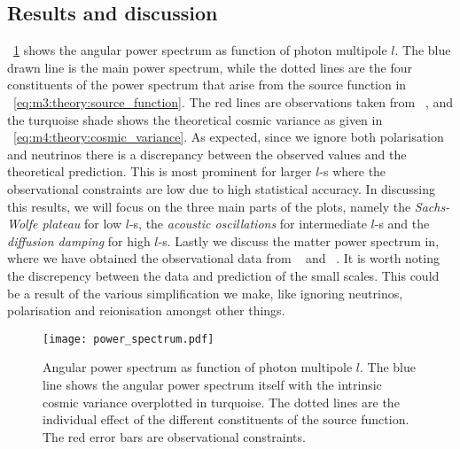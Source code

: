 \subsection{Results and discussion}\label{sec:m4:results}
    ~\cref{fig:m4:angular_power_spectrum} shows the angular power spectrum as function of photon multipole $l$. The blue drawn line is the main power spectrum, while the dotted lines are the four constituents of the power spectrum that arise from the source function in ~\cref{eq:m3:theory:source_function}. The red lines are observations taken from ~\cite{Planck2020}, and the turquoise shade shows the theoretical cosmic variance as given in ~\cref{eq:m4:theory:cosmic_variance}. As expected, since we ignore both polarisation and neutrinos there is a discrepancy between the observed values and the theoretical prediction. This is most prominent for larger $l$-s where the observational constraints are low due to high statistical accuracy. In discussing this results, we will focus on the three main parts of the plots, namely the \textit{Sachs-Wolfe plateau} for low $l$-s, the \textit{acoustic oscillations} for intermediate $l$-s and the \textit{diffusion damping} for high $l$-s. Lastly we discuss the matter power spectrum in, where we have obtained the observational data from ~\cite{Chabanier_2019} and ~\cite{Hlozek_2012}. It is worth noting the discrepency between the data and prediction of the small scales. This could be a result of the various simplification we make, like ignoring neutrinos, polarisation and reionisation amongst other things. 
    \begin{figure}
        \texttt{[image: power\_spectrum.pdf]}
        \caption{Angular power spectrum as function of photon multipole $l$. The blue line shows the angular power spectrum itself with the intrinsic cosmic variance overplotted in turquoise. The dotted lines are the individual effect of the different constituents of the source function. The red error bars are observational constraints.}
        \label{fig:m4:angular_power_spectrum}
    \end{figure}


